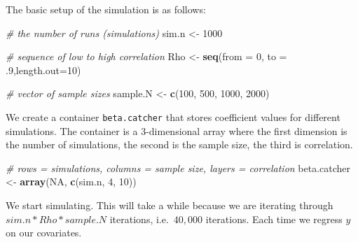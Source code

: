 \documentclass[]{article}
\newenvironment{Shaded}{\begin{snugshade}}{\end{snugshade}}
\newcommand{\CommentTok}[1]{\textcolor[rgb]{0.56,0.35,0.01}{\textit{#1}}}
\newcommand{\DataTypeTok}[1]{\textcolor[rgb]{0.13,0.29,0.53}{#1}}
\newcommand{\DecValTok}[1]{\textcolor[rgb]{0.00,0.00,0.81}{#1}}
\newcommand{\FloatTok}[1]{\textcolor[rgb]{0.00,0.00,0.81}{#1}}
\newcommand{\KeywordTok}[1]{\textcolor[rgb]{0.13,0.29,0.53}{\textbf{#1}}}
\newcommand{\NormalTok}[1]{#1}
\newcommand{\OtherTok}[1]{\textcolor[rgb]{0.56,0.35,0.01}{#1}}
\newcommand{\StringTok}[1]{\textcolor[rgb]{0.31,0.60,0.02}{#1}}
\begin{document}
The basic setup of the simulation is as follows:

\begin{Shaded}
\begin{Highlighting}[]
\CommentTok{# the number of runs (simulations)}
\NormalTok{sim.n <-}\StringTok{ }\DecValTok{1000}

\CommentTok{# sequence of low to high correlation}
\NormalTok{Rho <-}\StringTok{ }\KeywordTok{seq}\NormalTok{(}\DataTypeTok{from =} \DecValTok{0}\NormalTok{, }\DataTypeTok{to =} \FloatTok{.9}\NormalTok{,}\DataTypeTok{length.out=}\DecValTok{10}\NormalTok{)}

\CommentTok{# vector of sample sizes}
\NormalTok{sample.N <-}\StringTok{ }\KeywordTok{c}\NormalTok{(}\DecValTok{100}\NormalTok{, }\DecValTok{500}\NormalTok{, }\DecValTok{1000}\NormalTok{, }\DecValTok{2000}\NormalTok{)}
\end{Highlighting}
\end{Shaded}

We create a container \texttt{beta.catcher} that stores coefficient values for different simulations. The container is a 3-dimensional array where the first dimension is the number of simulations, the second is the sample size, the third is correlation.

\begin{Shaded}
\begin{Highlighting}[]
\CommentTok{# rows = simulations, columns = sample size, layers = correlation}
\NormalTok{beta.catcher <-}\StringTok{ }\KeywordTok{array}\NormalTok{(}\OtherTok{NA}\NormalTok{, }\KeywordTok{c}\NormalTok{(sim.n, }\DecValTok{4}\NormalTok{, }\DecValTok{10}\NormalTok{))}
\end{Highlighting}
\end{Shaded}

We start simulating. This will take a while because we are iterating through \(sim.n * Rho * sample.N\) iterations, i.e.~\(40,000\) iterations. Each time we regress \(y\) on our covariates.
\end{document}
